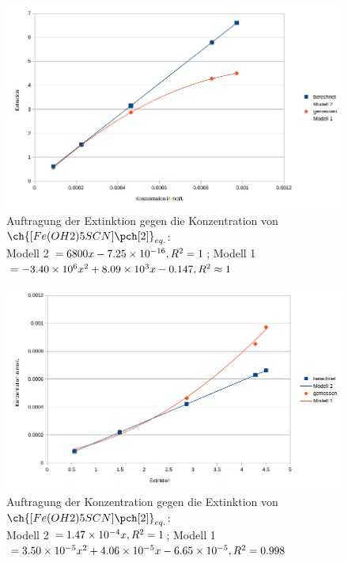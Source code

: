 \documentclass{article}
\begin{document}
    \begin{figure}[H]
      \includegraphics[scale=0.7, center]{Graphiken/Ergebnisse/ExtinktiongegenKonzentration.png} 
      \caption[Graph Auftragung der Extinktion gegen die Konzentration, Quelle: Autor]{Auftragung der Extinktion gegen die Konzentration von $\ch{[Fe(OH2)5SCN]\pch[2]}_{eq.}$: \\ Modell 2 $=6800 x-\num{7.25d-16}, R^2=1$; Modell 1 $=\num{-3.40d6} x^2 + \num{8.09d3} x - 0.147, R^2 \approx 1$}
      \label{fig:Extinktion}
    \end{figure}
    
    \begin{figure}[H]
      \includegraphics[scale=0.7, center]{Graphiken/Ergebnisse/KonzentrationgegenExtinktion.png} 
      \caption[Graph Auftragung der Konzentration gegen die Extinktion, Quelle: Autor]{Auftragung der Konzentration gegen die Extinktion von $\ch{[Fe(OH2)5SCN]\pch[2]}_{eq.}$: \\ Modell 2 $=\num{1.47d-4} x, R^2=1$; Modell 1 $=\num{3.50d-5} x^2 + \num{4.06d-5} x - \num{6.65d-5}, R^2 = 0.998$}
      \label{fig:Konzentration}
    \end{figure}
    
  \pagebreak
  
  \listofreactions
  \printbibliography[title=Literaturverzeichnis]
  \listoffigures
  \listoftables
  
\end{document}
